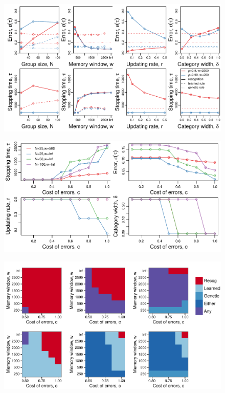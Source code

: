 \begin{figure}
\includegraphics[width=6.85in]{figures/parameters_exploration.pdf}
\caption{}
\end{figure}


\begin{figure}
\includegraphics[width=6.85in]{figures/strategies.pdf}
\caption{}
\end{figure}

\begin{figure}
\includegraphics[width=6.85in]{figures/best_type_of_learning.pdf}
\caption{}
\end{figure}

